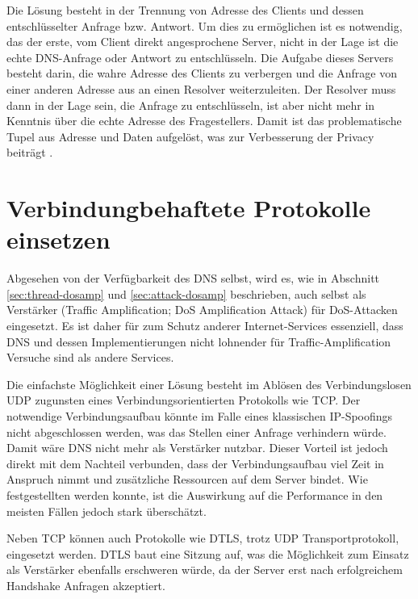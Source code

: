 Die Lösung besteht in der Trennung von Adresse des Clients und dessen entschlüsselter Anfrage bzw. Antwort. Um dies zu ermöglichen ist es notwendig, das der erste, vom Client direkt angesprochene Server, nicht in der Lage ist die echte DNS-Anfrage oder Antwort zu entschlüsseln. Die Aufgabe dieses Servers besteht darin, die wahre Adresse des Clients zu verbergen und die Anfrage von einer anderen Adresse aus an einen Resolver weiterzuleiten. Der Resolver muss dann in der Lage sein, die Anfrage zu entschlüsseln, ist aber nicht mehr in Kenntnis über die echte Adresse des Fragestellers. Damit ist das problematische Tupel aus Adresse und Daten aufgelöst, was zur Verbesserung der Privacy beiträgt \cite{Schmitt2018}.

\section{Verbindungbehaftete Protokolle einsetzen}
\label{sec:goals-trafficamp}
Abgesehen von der Verfügbarkeit des DNS selbst, wird es, wie in Abschnitt \ref{sec:thread-dosamp} und \ref{sec:attack-dosamp} beschrieben, auch selbst als Verstärker (Traffic Amplification; DoS Amplification Attack) für DoS-Attacken eingesetzt. Es ist daher für zum Schutz anderer Internet-Services essenziell, dass DNS und dessen Implementierungen nicht lohnender für Traffic-Amplification Versuche sind als andere Services.

Die einfachste Möglichkeit einer Lösung besteht im Ablösen des Verbindungslosen UDP zugunsten eines Verbindungsorientierten Protokolls wie TCP. Der notwendige Verbindungsaufbau könnte im Falle eines klassischen IP-Spoofings nicht abgeschlossen werden, was das Stellen einer Anfrage verhindern würde. Damit wäre DNS nicht mehr als Verstärker nutzbar. Dieser Vorteil ist jedoch direkt mit dem Nachteil verbunden, dass der Verbindungsaufbau viel Zeit in Anspruch nimmt und zusätzliche Ressourcen auf dem Server bindet. Wie festgestellten werden konnte, ist die Auswirkung auf die Performance in den meisten Fällen jedoch stark überschätzt\cite{Zhu2015}.

Neben TCP können auch Protokolle wie DTLS, trotz UDP Transportprotokoll, eingesetzt werden. DTLS baut eine Sitzung auf, was die Möglichkeit zum Einsatz als Verstärker ebenfalls erschweren würde, da der Server erst nach erfolgreichem Handshake Anfragen akzeptiert\cite{rfc6347}. 

